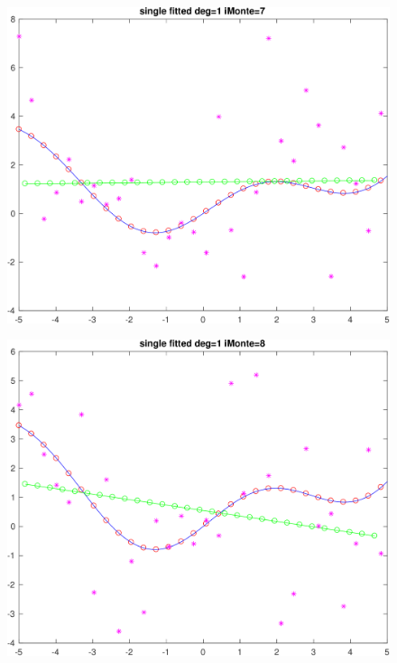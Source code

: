 \begin{figure}[h!]
\centering\includegraphics[scale=0.1]{single_poly_d_1_iMonte_7.png}
\end{figure}


\begin{figure}[h!]
\centering\includegraphics[scale=0.1]{single_poly_d_1_iMonte_8.png}
\end{figure}


